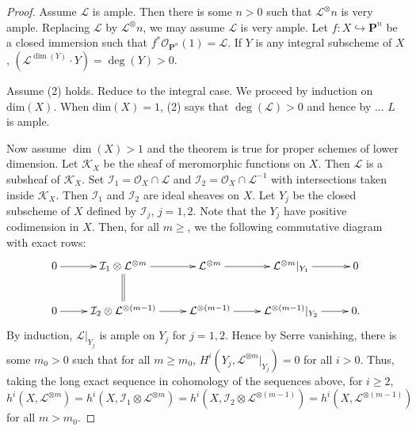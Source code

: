 \begin{proof}
Assume $\mathcal{L}$ is ample.
Then there is some $n > 0$ such that $\mathcal{L}^\otimes{n}$ is very ample.
Replacing $\mathcal{L}$ by $\mathcal{L}^\otimes{n}$, we may assume
$\mathcal{L}$ is very ample.
Let $f : X \hookrightarrow \mathbf{P}^n$ be a closed immersion such that
$f^*\mathcal{O}_{\mathbf{P}^n}(1) = \mathcal{L}$.
If $Y$ is any integral subscheme of $X$,
$(\mathcal{L}^{\dim(Y)} \cdot Y) = \deg(Y) > 0$.

Assume (2) holds.
Reduce to the integral case.
We proceed by induction on $\mathrm{dim}(X)$.
When $\mathrm{dim}(X) = 1$, (2) says that $\deg(\mathcal{L}) > 0$ and hence
by ... $L$ is ample.

Now assume $\dim(X) > 1$ and the theorem is true for proper schemes of lower
dimension.
Let $\mathcal{K}_X$ be the sheaf of meromorphic functions on $X$.
Then $\mathcal{L}$ is a subsheaf of $\mathcal{K}_X$.
Set $\mathcal{I}_1 = \mathcal{O}_X \cap \mathcal{L}$
and $\mathcal{I}_2 = \mathcal{O}_X \cap \mathcal{L}^{-1}$ with intersections
taken inside $\mathcal{K}_X$.
Then $\mathcal{I}_1$ and $\mathcal{I}_2$ are ideal sheaves on $X$.
Let $Y_j$ be the closed subscheme of $X$ defined by $\mathcal{I}_j$, $j = 1,2$.
Note that the $Y_j$ have positive codimension in $X$.
Then, for all $m \geq $, we the following commutative diagram with exact rows:
$$
\xymatrix{
  0 \ar[r]
    & \mathcal{I}_1 \otimes \mathcal{L}^{\otimes m} \ar[r] \ar@{=}[d]
    & \mathcal{L}^{\otimes m} \ar[r]
    & \mathcal{L}^{\otimes m}\rvert_{Y_1} \ar[r]
    & 0 \\
  0 \ar[r]
    & \mathcal{I}_2 \otimes \mathcal{L}^{\otimes (m-1)} \ar[r]
    & \mathcal{L}^{\otimes (m-1)} \ar[r]
    & \mathcal{L}^{\otimes (m-1)}\rvert_{Y_2} \ar[r]
    & 0.
}
$$
By induction, $\mathcal{L}\rvert_{Y_j}$ is ample on $Y_j$ for $j = 1,2$.
Hence by Serre vanishing, there is some $m_0 > 0$
such that for all $m \geq m_0$,
$H^i(Y_j,\mathcal{L}^{\otimes m}\rvert_{Y_j}) = 0$ for all $i > 0$.
Thus, taking the long exact sequence in cohomology of the sequences above,
for $i \geq 2$,
$$
  h^i(X,\mathcal{L}^{\otimes m})
    = h^i(X,\mathcal{I}_1 \otimes \mathcal{L}^{\otimes m})
    = h^i(X,\mathcal{I}_2 \otimes \mathcal{L}^{\otimes (m - 1)})
    = h^i(X,\mathcal{L}^{\otimes (m-1)})
$$
for all $m > m_0$.

\end{proof}
